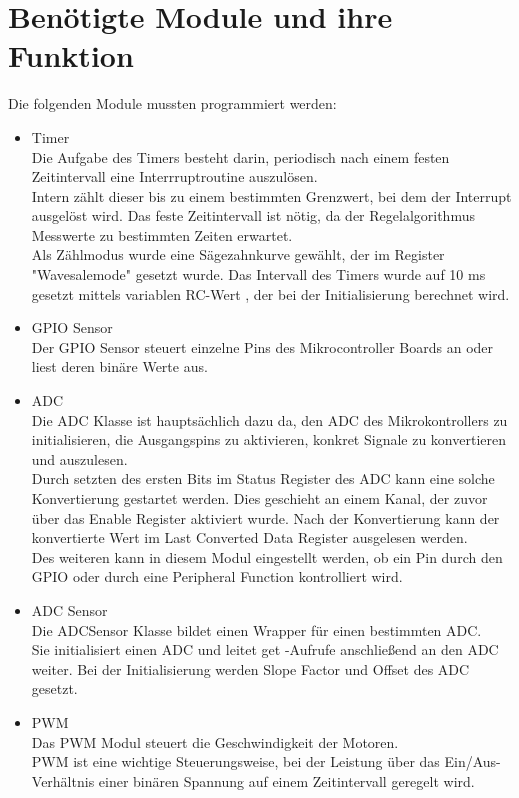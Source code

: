 \documentclass[a4paper,10pt,twoside]{report}
\begin{document}
\section{Benötigte Module und ihre Funktion}
Die folgenden Module mussten programmiert werden:
\begin{itemize}
\item Timer\\
Die Aufgabe des Timers besteht darin, periodisch nach einem festen Zeitintervall eine Interrruptroutine auszulösen.\\ Intern zählt dieser bis zu einem bestimmten Grenzwert, bei dem der Interrupt ausgelöst wird. Das feste Zeitintervall ist nötig, da der Regelalgorithmus Messwerte zu bestimmten Zeiten erwartet.\\
Als Zählmodus wurde eine Sägezahnkurve gewählt, der im Register "Wavesalemode" gesetzt wurde. Das Intervall des Timers wurde auf 10 ms gesetzt mittels variablen RC-Wert , der bei der Initialisierung berechnet wird.
\item GPIO Sensor\\
Der GPIO Sensor steuert einzelne Pins des Mikrocontroller Boards an oder liest deren binäre Werte aus.
\item ADC\\
Die ADC Klasse ist hauptsächlich dazu da, den ADC des Mikrokontrollers zu initialisieren, die Ausgangspins
zu aktivieren, konkret Signale zu konvertieren und auszulesen.\\
Durch setzten des ersten Bits im Status Register des ADC kann eine solche Konvertierung gestartet werden. 
Dies geschieht an einem Kanal, der zuvor über das Enable Register aktiviert wurde. 
Nach der Konvertierung kann der konvertierte Wert im Last Converted Data Register ausgelesen werden.\\
Des weiteren kann in diesem Modul eingestellt werden, ob ein Pin durch den GPIO oder durch
eine Peripheral Function kontrolliert wird.
\item ADC Sensor\\
Die ADCSensor Klasse bildet einen Wrapper für einen bestimmten ADC.\\
Sie initialisiert einen ADC und leitet get -Aufrufe anschließend an den ADC weiter. Bei der Initialisierung werden Slope Factor und Offset des ADC gesetzt.\\
\item PWM\\
Das PWM Modul steuert die Geschwindigkeit der Motoren.\\
PWM ist eine wichtige Steuerungsweise, bei der Leistung über das Ein/Aus-Verhältnis einer binären Spannung auf einem Zeitintervall geregelt wird.

\end{itemize}
\end{document}
